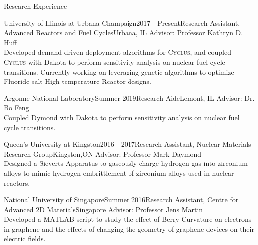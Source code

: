 \documentclass{resume2} %
\begin{document}

\begin{rSection}{Research Experience}

\begin{rSubsection}{University of Illinois at Urbana-Champaign}{2017 - Present}{Research Assistant, Advanced Reactors and Fuel Cycles}{Urbana, IL}
Advisor: Professor Kathryn D. Huff \\
Developed demand-driven deployment algorithms for \textsc{Cyclus}, and coupled \textsc{Cyclus} with Dakota 
to perform sensitivity analysis on nuclear fuel cycle transitions. Currently working on leveraging genetic 
algorithms to optimize Fluoride-salt High-temperature Reactor designs. 
\end{rSubsection}

\begin{rSubsection}{Argonne National Laboratory}{Summer 2019}{Research Aide}{Lemont, IL}
Advisor: Dr. Bo Feng \\ 
Coupled Dymond with Dakota to perform sensitivity analysis on nuclear fuel cycle transitions.
\end{rSubsection}

\begin{rSubsection}{Queen's University at Kingston}{2016 - 2017}{Research Assistant, Nuclear Materials Research Group}{Kingston,ON}
Advisor: Professor Mark Daymond \\
Designed a Sieverts Apparatus to gaseously charge hydrogen gas into zirconium alloys to 
mimic hydrogen embrittlement of zirconium alloys used in nuclear reactors.
\iffalse
The design is being implemented at Reactor Materials Testing Laboratory to test how hydrogen embrittled zirconium alloys respond in nuclear reactor conditions
 Application to nuclear industry: zirconium alloys used in nuclear reactors succumb to hydrogen embrittlement during its lifetime, therefore, it is important to be able to replicate the conditions in nuclear reactors, so as to study its end-of-life conditions
\fi
\end{rSubsection}

\begin{rSubsection}{National University of Singapore}{Summer 2016}{Research Assistant, Centre for Advanced 2D Materials}{Singapore}
Advisor: Professor Jens Martin \\	 
Developed a MATLAB script to study the effect of Berry Curvature on electrons in graphene and the 
effects of changing the geometry of graphene devices on their electric fields. 
\iffalse
Both programs were used to assist graduate students in their design of nano-graphene devices
\fi
\end{rSubsection}


\end{rSection}
\end{document}
